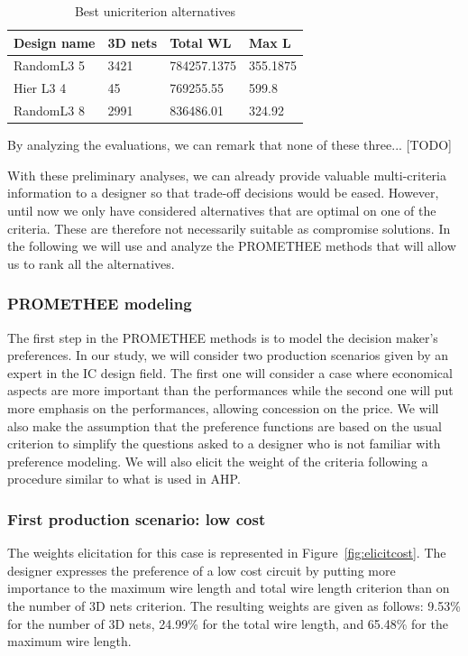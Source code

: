 \documentclass{svmult}
\begin{document}
\begin{table}[h!]
    \begin{center}
        \caption{Best unicriterion alternatives}
        \label{tab:bestunicritalt}
        \begin{tabular}{p{2.3cm}p{1.5cm}p{2cm}p{1.3cm}}
            \hline
            Design name & 3D nets & Total WL & Max L\\
            \hline
            RandomL3 5 & 3421 & 784257.1375 & 355.1875 \\
            Hier L3 4 & 45 & 769255.55 & 599.8 \\
            RandomL3 8 & 2991 & 836486.01 & 324.92 \\
            \hline
        \end{tabular}
    \end{center}
\end{table}

By analyzing the evaluations, we can remark that none of these three... [TODO]

With these preliminary analyses, we can already provide valuable multi-criteria information to a designer so that trade-off decisions would be eased. However, until now we only have considered alternatives that are optimal on one of the criteria. These are therefore not necessarily suitable as compromise solutions. In the following we will use and analyze the PROMETHEE methods that will allow us to rank all the alternatives.

\subsubsection{PROMETHEE modeling}
The first step in the PROMETHEE methods is to model the decision maker's preferences. In our study, we will consider two production scenarios given by an expert in the IC design field. The first one will consider a case where economical aspects are more important than the performances while the second one will put more emphasis on the performances, allowing concession on the price. We will also make the assumption that the preference functions are based on the usual criterion to simplify the questions asked to a designer who is not familiar with preference modeling. We will also elicit the weight of the criteria following a procedure similar to what is used in AHP.

\subsubsection*{First production scenario: low cost}
The weights elicitation for this case is represented in Figure~\ref{fig:elicitcost}. The designer expresses the preference of a low cost circuit by putting more importance to the maximum wire length and total wire length criterion than on the number of 3D nets criterion. The resulting weights are given as follows: 9.53\% for the number of 3D nets, 24.99\% for the total wire length, and 65.48\% for the maximum wire length.
\end{document}
